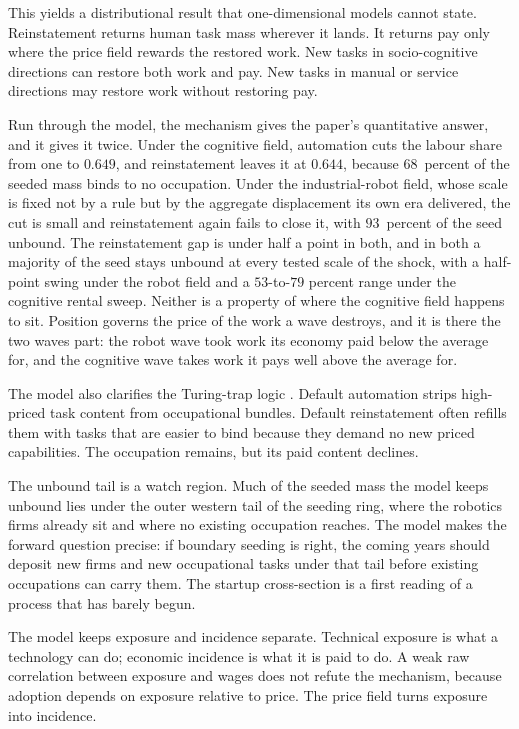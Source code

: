 \documentclass[12pt, a4paper]{article}
\begin{document}
This yields a distributional result that one-dimensional models cannot
state. Reinstatement returns human task mass wherever it lands. It
returns pay only where the price field rewards the restored work. New
tasks in socio-cognitive directions can restore both work and pay. New
tasks in manual or service directions may restore work without
restoring pay.

Run through the model, the mechanism gives the paper's quantitative
answer, and it gives it twice. Under the cognitive field, automation cuts
the labour share from one to $0.649$, and reinstatement leaves it at
$0.644$, because $68$~percent of the seeded mass binds to no occupation.
Under the industrial-robot field, whose scale is fixed not by a rule but
by the aggregate displacement its own era delivered, the cut is small and
reinstatement again fails to close it, with $93$~percent of the seed
unbound. The reinstatement gap is under half a point in both, and in both
a majority of the seed stays unbound at every tested scale of the shock,
with a half-point swing under the robot field and a $53$-to-$79$ percent
range under the cognitive rental sweep. Neither is a
property of where the cognitive field happens to sit. Position governs
the price of the work a wave destroys, and it is there the two waves
part: the robot wave took work its economy paid below the average for,
and the cognitive wave takes work it pays well above the average for.

The model also clarifies the Turing-trap logic \parencite{brynjolfsson2022turing}. Default automation strips
high-priced task content from occupational bundles. Default
reinstatement often refills them with tasks that are easier to bind
because they demand no new priced capabilities. The occupation remains,
but its paid content declines.

The unbound tail is a watch region. Much of the seeded mass the model
keeps unbound lies under the outer western tail of the seeding ring,
where the robotics firms already sit and where no existing occupation
reaches. The model makes the forward question precise: if boundary
seeding is right, the coming years should deposit new firms and new
occupational tasks under that tail before existing occupations can
carry them. The startup cross-section is a first reading of a process
that has barely begun.

The model keeps exposure and incidence separate. Technical exposure is
what a technology can do; economic incidence is what it is paid to do.
A weak raw correlation between exposure and wages does not refute the
mechanism, because adoption depends on exposure relative to price. The
price field turns exposure into incidence.
\end{document}
